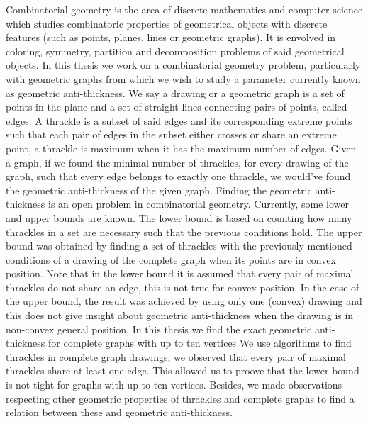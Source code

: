 Combinatorial geometry is the area of discrete mathematics and computer science which studies combinatoric properties of geometrical objects with discrete features (such as points, planes, lines or geometric graphs). It is envolved in coloring, symmetry, partition and decomposition problems of said geometrical objects. In this thesis we work on a combinatorial geometry problem, particularly with geometric graphs from which we wish to study a parameter currently known as geometric anti-thickness. We say a drawing or a geometric graph is a set of points in the plane and a set of straight lines connecting pairs of points, called edges. A thrackle is a subset of said edges and its corresponding extreme points such that each pair of edges in the subset either crosses or share an extreme point, a thrackle is maximum when it has the maximum number of edges. Given a graph, if we found the minimal number of thrackles, for every drawing of the graph, such that every edge belongs to exactly one thrackle, we would've found the geometric anti-thickness of the given graph.
Finding the geometric anti-thickness is an open problem in combinatorial geometry. Currently, some lower and upper bounds are known. The lower bound is based on counting how many thrackles in a set are necessary such that the previous conditions hold. The upper bound was obtained by finding a set of thrackles with the previously mentioned conditions of a drawing of the complete graph when its points are in convex position. Note that in the lower bound it is assumed that every pair of maximal thrackles do not share an edge, this is not true for convex position. In the case of the upper bound, the result was achieved by using only one  (convex) drawing and this does not give insight about geometric anti-thickness when the drawing is in non-convex general position. In this thesis we find the exact geometric anti-thickness for complete graphs with up to ten vertices We use algorithms to find thrackles in complete graph drawings, we observed that every pair of maximal thrackles share at least one edge. This allowed us to proove that the lower bound is not tight for graphs with up to ten vertices. Besides, we made observations respecting other geometric properties of thrackles and complete graphs to find a relation between these and geometric anti-thickness.
